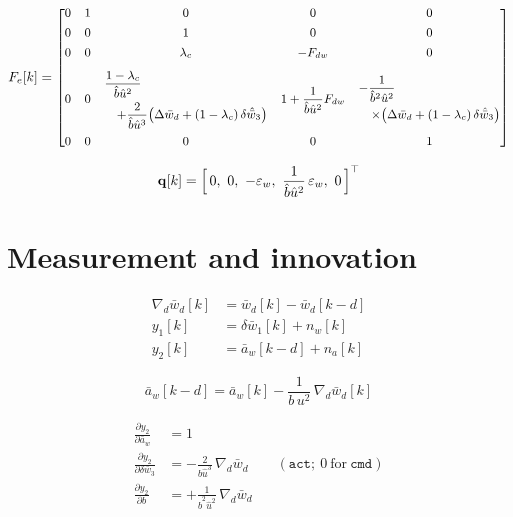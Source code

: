 \documentclass[11pt,a4paper,fontset=none]{ctexart}
\newcommand{\ba}{\bar{a}}
\newcommand{\bw}{\bar{w}}
\begin{document}
\begin{equation*}
\small
F_e[k] =
\begin{bmatrix}
0 & 1 & 0 & 0 & 0 \\[0.4em]
0 & 0 & 1 & 0 & 0 \\[0.4em]
0 & 0 & \lambda_c & -F_{dw} & 0 \\[0.8em]
0 & 0
  & \begin{array}{@{}l@{}}
      \dfrac{1-\lambda_c}{\hat{b}\hat{u}^{2}} \\[0.9em]
      \quad + \dfrac{2}{\hat{b}\hat{u}^{3}}
        \bigl(\Delta\bw_d + (1-\lambda_c)\,\delta\hat{\bw}_3\bigr)
    \end{array}
  & 1 + \dfrac{1}{\hat{b}\hat{u}^{2}}F_{dw}
  & \begin{array}{@{}l@{}}
      -\dfrac{1}{\hat{b}^{2}\hat{u}^{2}} \\[0.9em]
      \quad \times \bigl(\Delta\bw_d + (1-\lambda_c)\,\delta\hat{\bw}_3\bigr)
    \end{array} \\[2.2em]
0 & 0 & 0 & 0 & 1
\end{bmatrix}
\end{equation*}

\begin{equation*}
\mathbf{q}[k] = \Bigl[\,0,\ 0,\ -\varepsilon_w,\
\frac{1}{\hat{b}\hat{u}^{2}}\,\varepsilon_w,\ 0\,\Bigr]^{\top}
\end{equation*}

\section{Measurement and innovation}

\begin{align*}
\nabla_d\bw_d[k] &= \bw_d[k] - \bw_d[k-d] \\
y_1[k] &= \delta\bw_1[k] + n_w[k] \\
y_2[k] &= \ba_w[k-d] + n_a[k]
\end{align*}

\begin{equation*}
\ba_w[k-d] = \ba_w[k] - \frac{1}{b\,u^{2}}\,\nabla_d\bw_d[k]
\end{equation*}

\begin{align*}
\frac{\partial y_2}{\partial \ba_w} &= 1 \\
\frac{\partial y_2}{\partial \delta\bw_3}
  &= -\frac{2}{\hat{b}\hat{u}^{3}}\,\nabla_d\bw_d
  \qquad (\texttt{act}; \ 0 \ \text{for} \ \texttt{cmd}) \\
\frac{\partial y_2}{\partial b}
  &= +\frac{1}{\hat{b}^{2}\hat{u}^{2}}\,\nabla_d\bw_d
\end{align*}
\end{document}
